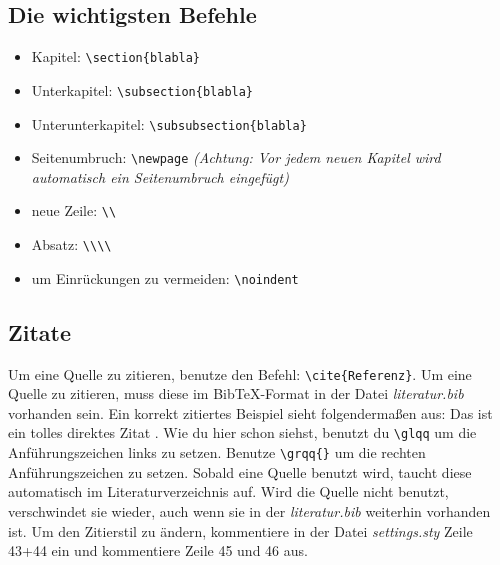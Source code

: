 \subsection{Die wichtigsten Befehle}
    \begin{itemize}
        \item Kapitel: \verb|\section{blabla}|
        \item Unterkapitel: \verb|\subsection{blabla}|
        \item Unterunterkapitel: \verb|\subsubsection{blabla}|
        \item Seitenumbruch: \verb|\newpage| \textit{(Achtung: Vor jedem neuen Kapitel wird automatisch ein Seitenumbruch eingefügt)}
        \item neue Zeile: \verb|\\|
        \item Absatz: \verb|\\\\|
        \item um Einrückungen zu vermeiden: \verb|\noindent|
    \end{itemize}

\subsection{Zitate}
    Um eine Quelle zu zitieren, benutze den Befehl: \verb|\cite{Referenz}|. Um eine Quelle zu zitieren, muss diese im BibTeX-Format in der Datei \textit{literatur.bib} vorhanden sein. Ein korrekt zitiertes Beispiel sieht folgendermaßen aus: \glqq Das ist ein tolles direktes Zitat\grqq{} \cite{Beaufays.2015}. Wie du hier schon siehst, benutzt du \verb|\glqq| um die Anführungszeichen links zu setzen. Benutze \verb|\grqq{}| um die rechten Anführungszeichen zu setzen. Sobald eine Quelle benutzt wird, taucht diese automatisch im Literaturverzeichnis auf. Wird die Quelle nicht benutzt, verschwindet sie wieder, auch wenn sie in der \textit{literatur.bib} weiterhin vorhanden ist. Um den Zitierstil zu ändern, kommentiere in der Datei \textit{settings.sty} Zeile 43+44 ein und kommentiere Zeile 45 und 46 aus.

